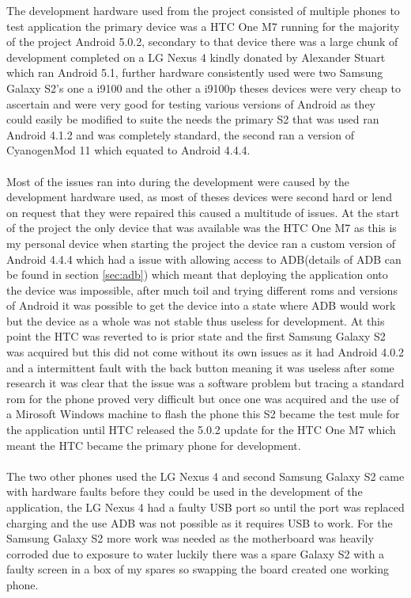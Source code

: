The development hardware used from the project consisted of multiple phones to test application the primary device was a HTC One M7 running for the majority of the project Android 5.0.2, secondary to that device there was a large chunk of development completed on a LG Nexus 4 kindly donated by Alexander Stuart which ran Android 5.1, further hardware consistently used were two Samsung Galaxy S2's one a i9100 and the other a i9100p theses devices were very cheap to ascertain and were very good for testing various versions of Android as they could easily be modified to suite the needs the primary S2 that was used ran Android 4.1.2 and was completely standard, the second ran a version of CyanogenMod 11 which equated to Android 4.4.4.\\
\\
Most of the issues ran into during the development were caused by the development hardware used, as most of theses devices were second hard or lend on request that they were repaired this caused a multitude of issues. At the start of the project the only device that was available was the HTC One M7 as this is my personal device when starting the project the device ran a custom version of Android 4.4.4 which had a issue with allowing access to ADB(details of ADB can be found in section \ref{sec:adb}) which meant that deploying the application onto the device was impossible, after much toil and trying different roms and versions of Android it was possible to get the device into a state where ADB would work but the device as a whole was not stable thus useless for development. At this point the HTC was reverted to is prior state and the first Samsung Galaxy S2 was acquired but this did not come without its own issues as it had Android 4.0.2 and a intermittent fault with the back button meaning it was useless after some research it was clear that the issue was a software problem but tracing a standard rom for the phone proved very difficult but once one was acquired and the use of a Mirosoft Windows machine to flash the phone this S2 became the test mule for the application until HTC released the 5.0.2 update for the HTC One M7 which meant the HTC became the primary phone for development.\\
\\
The two other phones used the LG Nexus 4 and second Samsung Galaxy S2 came with hardware faults before they could be used in the development of the application, the LG Nexus 4 had a faulty USB port so until the port was replaced charging and the use ADB was not possible as it requires USB to work. For the Samsung Galaxy S2 more work was needed as the motherboard was heavily corroded due to exposure to water luckily there was a spare Galaxy S2 with a faulty screen in a box of my spares so swapping the board created one working phone.\\
